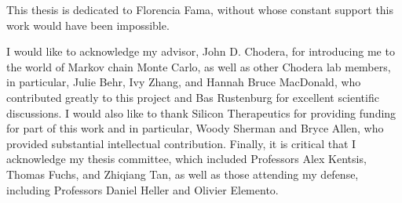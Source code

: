 \documentclass[phd,tocprelim]{cornell}
\begin{document}
\begin{dedication}
This thesis is dedicated to Florencia Fama, without whose constant support this work would have been impossible.
\end{dedication}

\begin{acknowledgements}
I would like to acknowledge my advisor, John D. Chodera, for introducing me to the world of Markov chain Monte Carlo, as well as other Chodera lab members, in particular, Julie Behr, Ivy Zhang, and Hannah Bruce MacDonald, who contributed greatly to this project and Bas Rustenburg for excellent scientific discussions. I would also like to thank Silicon Therapeutics for providing funding for part of this work and in particular, Woody Sherman and Bryce Allen, who provided substantial intellectual contribution. Finally, it is critical that I acknowledge my thesis committee, which included Professors Alex Kentsis, Thomas Fuchs, and Zhiqiang Tan, as well as those attending my defense, including Professors Daniel Heller and Olivier Elemento.
\end{acknowledgements}

\contentspage
\tablelistpage
\figurelistpage

\normalspacing \setcounter{page}{1} 
\pagestyle{cornell} \addtolength{\parskip}{0.5\baselineskip}



















\appendix




\end{document}
